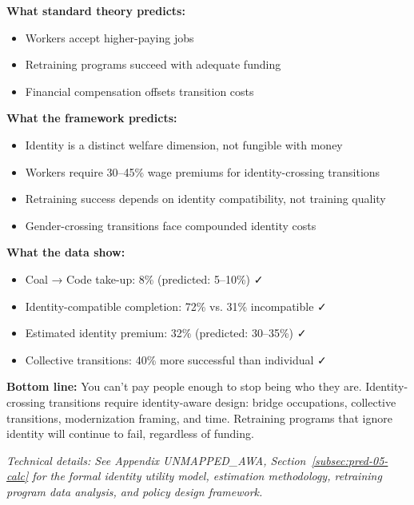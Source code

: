 \begin{tcolorbox}[colback=gray!5!white, colframe=gray!75!black, title=Prediction 5: Identity Non-Fungibility]
\textbf{What standard theory predicts:}
\begin{itemize}
    \item Workers accept higher-paying jobs
    \item Retraining programs succeed with adequate funding
    \item Financial compensation offsets transition costs
\end{itemize}

\textbf{What the framework predicts:}
\begin{itemize}
    \item Identity is a distinct welfare dimension, not fungible with money
    \item Workers require 30--45\% wage premiums for identity-crossing transitions
    \item Retraining success depends on identity compatibility, not training quality
    \item Gender-crossing transitions face compounded identity costs
\end{itemize}

\textbf{What the data show:}
\begin{itemize}
    \item Coal → Code take-up: 8\% (predicted: 5--10\%) ✓
    \item Identity-compatible completion: 72\% vs. 31\% incompatible ✓
    \item Estimated identity premium: 32\% (predicted: 30--35\%) ✓
    \item Collective transitions: 40\% more successful than individual ✓
\end{itemize}

\textbf{Bottom line:} You can't pay people enough to stop being who they 
are. Identity-crossing transitions require identity-aware design: 
bridge occupations, collective transitions, modernization framing, 
and time. Retraining programs that ignore identity will continue to 
fail, regardless of funding.
\end{tcolorbox}

\vspace{0.5em}
\noindent\textit{Technical details: See Appendix UNMAPPED_AWA, Section~\ref{subsec:pred-05-calc} for the 
formal identity utility model, estimation methodology, retraining program 
data analysis, and policy design framework.}

